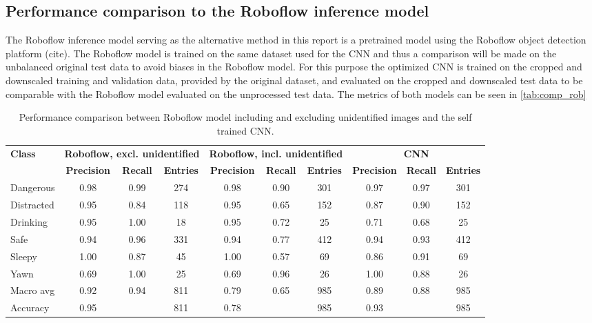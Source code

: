 \subsection{Performance comparison to the Roboflow inference model}
The Roboflow inference model serving as the alternative method in this report is a pretrained model using the Roboflow object detection platform (cite). The Roboflow model is trained on the same dataset used for the CNN and thus a comparison will be made on the unbalanced original test data to avoid biases in the Roboflow model. For this purpose the optimized CNN is trained on the cropped and downscaled training and validation data, provided by the original dataset, and evaluated on the cropped and downscaled test data to be comparable with the Roboflow model evaluated on the unprocessed test data. 
The metrics of both models can be seen in \autoref{tab:comp_rob}
\begin{table}[htbp]
    \centering
    \caption{Performance comparison between Roboflow model including and excluding unidentified images and the self trained CNN.}
    \vspace{3pt}
    \label{tab:comp_rob}
    \begin{adjustbox}{max width=\textwidth}
    \begin{tabular}{l|cc|c|cc|c|cc|c}
        \toprule
        \textbf{Class} & \multicolumn{3}{c|}{\textbf{Roboflow, excl. unidentified}} & \multicolumn{3}{c|}{\textbf{Roboflow, incl. unidentified}} & \multicolumn{3}{c}{\textbf{CNN}} \\
        \cmidrule{2-10}
         & \textbf{Precision} & \textbf{Recall} & \textbf{Entries} & \textbf{Precision} & \textbf{Recall} & \textbf{Entries} & \textbf{Precision} & \textbf{Recall} & \textbf{Entries} \\
        \midrule
        Dangerous & 0.98 & 0.99 & 274 & 0.98 & 0.90 & 301 & 0.97 & 0.97 & 301 \\
        Distracted & 0.95 & 0.84 & 118 & 0.95 & 0.65 & 152 & 0.87 & 0.90 & 152 \\
        Drinking & 0.95 & 1.00 & 18 & 0.95 & 0.72 & 25 & 0.71 & 0.68 & 25 \\
        Safe & 0.94 & 0.96 & 331 & 0.94 & 0.77 & 412 & 0.94 & 0.93 & 412 \\
        Sleepy & 1.00 & 0.87 & 45 & 1.00 & 0.57 & 69 & 0.86 & 0.91 & 69 \\
        Yawn & 0.69 & 1.00 & 25 & 0.69 & 0.96 & 26 & 1.00 & 0.88 & 26 \\
        \midrule
        Macro avg & 0.92 & 0.94 & 811 & 0.79 & 0.65 & 985 & 0.89 & 0.88 & 985 \\
        Accuracy & 0.95 & \phantom{0} & 811 & 0.78 & \phantom{0} & 985 & 0.93 & \phantom{0} & 985 \\
        \bottomrule
    \end{tabular}
    \end{adjustbox}
\end{table}
